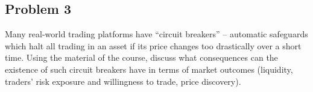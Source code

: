 %
%
%




\quad
\subsection*{Problem 3}

Many real-world trading platforms have ``circuit breakers'' -- automatic safeguards which halt all trading in an asset if its price changes too drastically over a short time. Using the material of the course, discuss what consequences can the existence of such circuit breakers have in terms of market outcomes (liquidity, traders' risk exposure and willingness to trade, price discovery).



